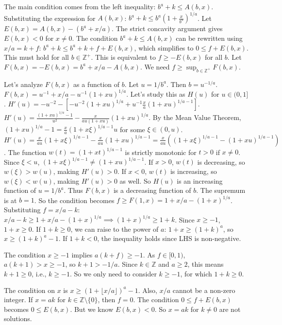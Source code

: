 \documentclass[12pt,a4paper]{article}
\theoremstyle{definition}
\begin{document}
    The main condition comes from the left inequality: $b^a+k \leq A(b,x)$.
    Substituting the expression for $A(b,x)$:
    $b^a+k \leq b^a \left(1 + \frac{x}{b^a}\right)^{1/a}$.
    Let $E(b,x) = A(b,x) - (b^a+x/a)$. The strict concavity argument gives $E(b,x) < 0$ for $x \neq 0$.
    The condition $b^a+k \leq A(b,x)$ can be rewritten using $x/a=k+f$:
    $b^a+k \leq b^a+k+f+E(b,x)$, which simplifies to $0 \leq f+E(b,x)$.
    This must hold for all $b \in \mathbb{Z}^+$.
    This is equivalent to $f \geq -E(b,x)$ for all $b$. Let $F(b,x) = -E(b,x) = b^a+x/a - A(b,x)$.
    We need $f \geq \sup_{b \in \mathbb{Z}^+} F(b,x)$.

    Let's analyze $F(b,x)$ as a function of $b$. Let $u=1/b^a$. Then $b=u^{-1/a}$.
    $F(b,x) = u^{-1} + x/a - u^{-1}(1+xu)^{1/a}$. Let's study this as $H(u)$ for $u \in (0,1]$.
    $H'(u) = -u^{-2} - \left[-u^{-2}(1+xu)^{1/a} + u^{-1} \frac{x}{a}(1+xu)^{1/a-1}\right]$.
    $H'(u) = \frac{(1+xu)^{1/a}-1}{u^2} - \frac{x}{au(1+xu)}(1+xu)^{1/a}$.
    By the Mean Value Theorem, $(1+xu)^{1/a}-1 = \frac{x}{a}(1+x\xi)^{1/a-1}u$ for some $\xi \in (0,u)$.
    $H'(u) = \frac{x}{au}(1+x\xi)^{1/a-1} - \frac{x}{au}(1+xu)^{1/a-1} = \frac{x}{au}\left((1+x\xi)^{1/a-1} - (1+xu)^{1/a-1}\right)$.
    The function $w(t)=(1+xt)^{1/a-1}$ is strictly monotonic for $t>0$ if $x \neq 0$. Since $\xi < u$, $(1+x\xi)^{1/a-1} \neq (1+xu)^{1/a-1}$.
    If $x>0$, $w(t)$ is decreasing, so $w(\xi)>w(u)$, making $H'(u)>0$.
    If $x<0$, $w(t)$ is increasing, so $w(\xi)<w(u)$, making $H'(u)>0$ as well.
    So $H(u)$ is an increasing function of $u=1/b^a$. Thus $F(b,x)$ is a decreasing function of $b$.
    The supremum is at $b=1$.
    So the condition becomes $f \geq F(1,x) = 1+x/a - (1+x)^{1/a}$.
    Substituting $f=x/a-k$:
    $x/a - k \geq 1+x/a - (1+x)^{1/a} \implies (1+x)^{1/a} \geq 1+k$.
    Since $x \geq -1$, $1+x \geq 0$.
    If $1+k \geq 0$, we can raise to the power of $a$: $1+x \geq (1+k)^a$, so $x \geq (1+k)^a-1$.
    If $1+k < 0$, the inequality holds since LHS is non-negative.

    The condition $x \geq -1$ implies $a(k+f) \geq -1$. As $f \in [0,1)$, $a(k+1) > x \geq -1$, so $k+1 > -1/a$. Since $k \in \mathbb{Z}$ and $a \geq 2$, this means $k+1 \geq 0$, i.e., $k \geq -1$.
    So we only need to consider $k \geq -1$, for which $1+k \geq 0$.

    The condition on $x$ is $x \geq (1+\lfloor x/a \rfloor)^a-1$.
    Also, $x/a$ cannot be a non-zero integer. If $x=ak$ for $k \in \mathbb{Z}\setminus\{0\}$, then $f=0$. The condition $0 \leq f+E(b,x)$ becomes $0 \leq E(b,x)$. But we know $E(b,x) < 0$. So $x=ak$ for $k \neq 0$ are not solutions.
\end{document}
